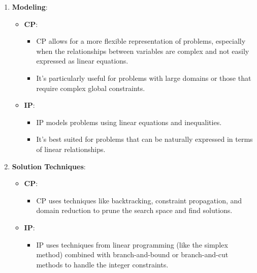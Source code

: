 \begin{enumerate}[label=\textbf{\arabic*.}]
    \item \textbf{Modeling}:
    \begin{itemize}
        \item \textbf{CP}:
        \begin{itemize}
            \item CP allows for a more flexible representation of problems, especially when the relationships between variables are complex and not easily expressed as linear equations.
            \item It's particularly useful for problems with large domains or those that require complex global constraints.
        \end{itemize}
        \item \textbf{IP}:
        \begin{itemize}
            \item IP models problems using linear equations and inequalities.
            \item It's best suited for problems that can be naturally expressed in terms of linear relationships.
        \end{itemize}
    \end{itemize}
    
    \item \textbf{Solution Techniques}:
    \begin{itemize}
        \item \textbf{CP}:
        \begin{itemize}
            \item CP uses techniques like backtracking, constraint propagation, and domain reduction to prune the search space and find solutions.
        \end{itemize}
        \item \textbf{IP}:
        \begin{itemize}
            \item IP uses techniques from linear programming (like the simplex method) combined with branch-and-bound or branch-and-cut methods to handle the integer constraints.
        \end{itemize}
    \end{itemize}
    

\end{enumerate}
